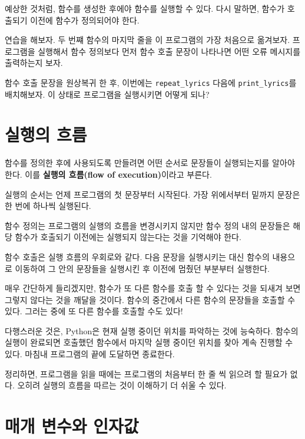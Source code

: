 \documentclass[10pt]{book}
\begin{document}
예상한 것처럼, 함수를 생성한 후에야 함수를 실행할 수 있다.  다시
말하면, 함수가 호출되기 이전에 함수가 정의되어야 한다.

연습을 해보자. 두 번쨰 함수의 마지막 줄을 이 프로그램의 가장 처음으로
옮겨보자.  프로그램을 실행해서 함수 정의보다 먼저 함수 호출 문장이
나타나면 어떤 오류 메시지를 출력하는지 보자.

함수 호출 문장을 원상복귀 한 후, 이번에는 \verb"repeat_lyrics"
다음에 \verb"print_lyrics"를 배치해보자.  이 상태로 프로그램을
실행시키면 어떻게 되나?



\section{실행의 흐름}

함수를 정의한 후에 사용되도록 만들려면 어떤 순서로 문장들이
실행되는지를 알아야 한다.  이를 {\bf 실행의 흐름(flow of
  execution)}이라고 부른다.


실행의 순서는 언제 프로그램의 첫 문장부터 시작된다.  가장 위에서부터
밑까지 문장은 한 번에 하나씩 실행된다.

함수 정의는 프로그램의 실행의 흐름을 변경시키지 않지만 함수 정의 내의
문장들은 해당 함수가 호출되기 이전에는 실행되지 않는다는 것을 기억해야
한다.

함수 호출은 실행 흐름의 우회로와 같다.  다음 문장을 실행시키는 대신
함수의 내용으로 이동하여 그 안의 문장들을 실행시킨 후 이전에 멈췄던
부분부터 실행한다.

매우 간단하게 들리겠지만, 함수가 또 다른 함수를 호출 할 수 있다는 것을
되새겨 보면 그렇지 않다는 것을 깨달을 것이다.  함수의 중간에서 다른
함수의 문장들을 호출할 수 있다.  그러는 중에 또 다른 함수를 호출할 수도
있다!

다행스러운 것은, Python은 현재 실행 중이던 위치를 파악하는 것에
능숙하다.  함수의 실행이 완료되면 호출했던 함수에서 마지막 실행 중이던
위치를 찾아 계속 진행할 수 있다.  마침내 프로그램의 끝에 도달하면
종료한다.

정리하면, 프로그램을 읽을 때에는 프로그램의 처음부터 한 줄 씩 읽으려 할
필요가 없다.  오히려 실행의 흐름을 따르는 것이 이해하기 더 쉬울 수 있다.


\section{매개 변수와 인자값}
\label{parameters}
\end{document}
